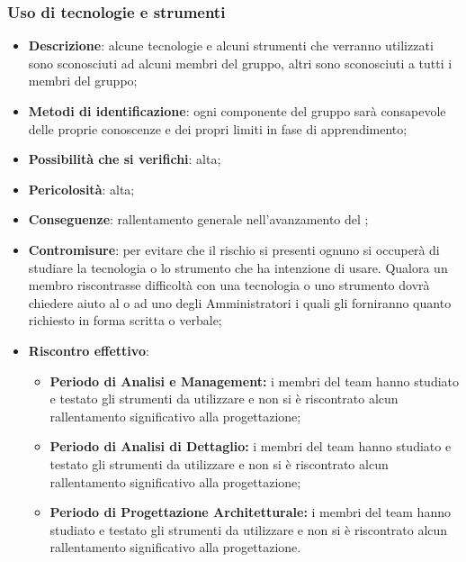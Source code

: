 		\subsubsection{Uso di tecnologie e strumenti}
			\begin{itemize}
				\item \textbf{Descrizione}: alcune tecnologie e alcuni strumenti che verranno utilizzati sono sconosciuti ad alcuni membri del gruppo, altri sono sconosciuti a tutti i membri del gruppo; 
				\item \textbf{Metodi di identificazione}: ogni componente del gruppo sarà consapevole delle proprie conoscenze e dei propri limiti in fase di apprendimento;
				\item \textbf{Possibilità che si verifichi}: alta;
				\item \textbf{Pericolosità}: alta;
				\item \textbf{Conseguenze}: rallentamento generale nell'avanzamento del ;
				\item \textbf{Contromisure}:  per evitare che il rischio si presenti ognuno si occuperà di studiare la tecnologia o lo strumento che ha intenzione di usare. Qualora un membro riscontrasse difficoltà con una tecnologia o uno strumento dovrà chiedere aiuto al \RES{} o ad uno degli Amministratori i quali gli forniranno quanto richiesto in forma scritta o verbale;
				\item \textbf{Riscontro effettivo}:
				\begin{itemize}
					\item \textbf{Periodo di Analisi e Management:} i membri del team hanno studiato e testato gli strumenti da utilizzare e non si è riscontrato alcun rallentamento significativo alla progettazione;
					\item \textbf{Periodo di Analisi di Dettaglio:} i membri del team hanno studiato e testato gli strumenti da utilizzare e non si è riscontrato alcun rallentamento significativo alla progettazione;
					\item \textbf{Periodo di Progettazione Architetturale:} i membri del team hanno studiato e testato gli strumenti da utilizzare e non si è riscontrato alcun rallentamento significativo alla progettazione.
				\end{itemize}
			\end{itemize}	
		
